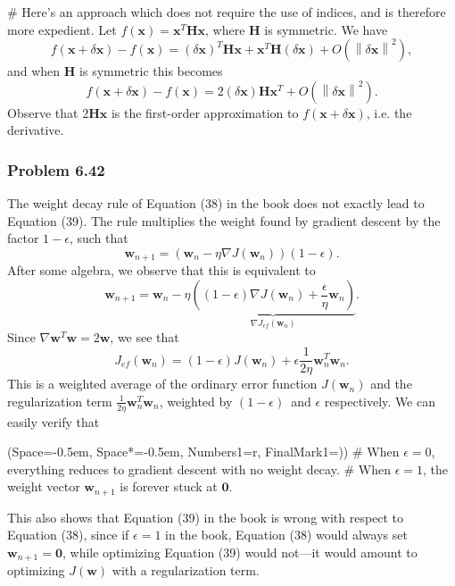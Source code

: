 \documentclass[12pt, a4paper]{article}
\newcommand{\listSpace}{-0.5em}%
\newcommand{\vect}[1]{\bm{#1}}
\newcommand{\norm}[1]{\left\lVert#1\right\rVert}
\begin{document}
{\begin{easylist}[enumerate]
	# Here's an approach which does not require the use of indices, and is therefore more expedient.
	Let $f(\vect{x}) = \vect{x}^T \vect{H} \vect{x}$, where $\vect{H}$ is symmetric.
	We have
	\begin{equation*}
		f( \vect{x} + \delta \vect{x}) - f( \vect{x}) = 
		\left( \delta \vect{x} \right)^T \vect{H} \vect{x} + 
		\vect{x}^T \vect{H} \left( \delta \vect{x} \right)
		+ O \left( \norm{ \delta \vect{x} }^2 \right),
	\end{equation*}
	and when $\vect{H}$ is symmetric this becomes 
	\begin{equation*}
			f(\vect{x} + \delta \vect{x}) - f( \vect{x}) = 
			2 \left( \delta \vect{x} \right)  \vect{H} \vect{x}^T
			+ O \left( \norm{ \delta \vect{x} }^2 \right).
	\end{equation*}
	Observe that $2 \vect{H} \vect{x}$ is the first-order approximation to  $f(\vect{x} + \delta \vect{x})$, i.e. the derivative.
	
\end{easylist}

\subsubsection*{Problem 6.42}
The weight decay rule of Equation (38) in the book does not exactly lead to Equation (39).
The rule multiplies the weight found by gradient descent by the factor $1 - \epsilon$, such that 
\begin{equation*}
	\vect{w}_{n+1} = \left( \vect{w}_{n} - \eta \nabla J(\vect{w}_n ) \right) (1 - \epsilon).
\end{equation*}
After some algebra, we observe that this is equivalent to
\begin{equation*}
		\vect{w}_{n+1} = \vect{w}_{n} - \eta  \underbrace{\left(
			(1 - \epsilon ) \nabla J(\vect{w}_n ) + \frac{\epsilon}{\eta} \vect{w}_n
			\right)}_{\nabla J_{ef}(\vect{w}_n)} .
\end{equation*}
Since $\nabla \vect{w}^T \vect{w} = 2 \vect{w}$, we see that
\begin{equation*}
J_{ef}(\vect{w}_n) = (1 - \epsilon ) J(\vect{w}_n ) + \epsilon \frac{1}{2 \eta} \vect{w}_n^T \vect{w}_n.
\end{equation*}
This is a weighted average of the ordinary error function $J(\vect{w}_n )$ and the regularization term $\frac{1}{2 \eta} \vect{w}_n^T \vect{w}_n$, weighted by $(1 - \epsilon )$ and $\epsilon$ respectively.
We can easily verify that 
\begin{easylist}[enumerate]
	\ListProperties(Space=\listSpace, Space*=\listSpace, Numbers1=r, FinalMark1={)})
	# When $\epsilon = 0$, everything reduces to gradient descent with no weight decay.
	# When $\epsilon = 1$, the weight vector $\vect{w}_{n+1}$ is forever stuck at $\vect{0}$.
\end{easylist}
This also shows that Equation (39) in the book is wrong with respect to Equation (38), since if $\epsilon=1$ in the book, Equation (38) would always set $\vect{w}_{n+1} = \vect{0}$, while optimizing Equation (39) would not---it would amount to optimizing $J(\vect{w} )$ with a regularization term.





}
\end{document}
